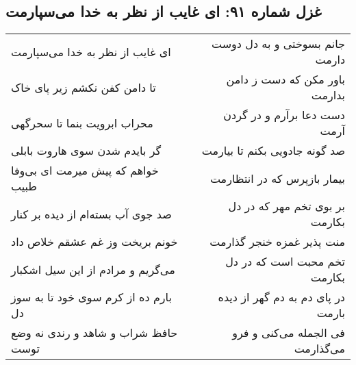 \begin{center}
\section*{غزل شماره ۹۱: ای غایب از نظر به خدا می‌سپارمت}
\label{sec:sh091}
\begin{longtable}{l p{0.5cm} r}
ای غایب از نظر به خدا می‌سپارمت
&&
جانم بسوختی و به دل دوست دارمت
\\
تا دامن کفن نکشم زیر پای خاک
&&
باور مکن که دست ز دامن بدارمت
\\
محراب ابرویت بنما تا سحرگهی
&&
دست دعا برآرم و در گردن آرمت
\\
گر بایدم شدن سوی هاروت بابلی
&&
صد گونه جادویی بکنم تا بیارمت
\\
خواهم که پیش میرمت ای بی‌وفا طبیب
&&
بیمار بازپرس که در انتظارمت
\\
صد جوی آب بسته‌ام از دیده بر کنار
&&
بر بوی تخم مهر که در دل بکارمت
\\
خونم بریخت وز غم عشقم خلاص داد
&&
منت پذیر غمزه خنجر گذارمت
\\
می‌گریم و مرادم از این سیل اشکبار
&&
تخم محبت است که در دل بکارمت
\\
بارم ده از کرم سوی خود تا به سوز دل
&&
در پای دم به دم گهر از دیده بارمت
\\
حافظ شراب و شاهد و رندی نه وضع توست
&&
فی الجمله می‌کنی و فرو می‌گذارمت
\\
\end{longtable}
\end{center}
